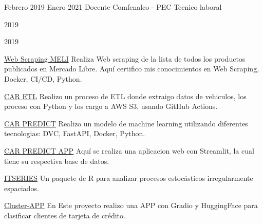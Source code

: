 {Febrero 2019}
{Enero 2021}
{Docente}
{Comfenalco - PEC}
{Tecnico laboral}
{
\jbegin
\jend
}



{2019}
{\lrand[1]}
{\lrand[3]}
{\jbegin
    \jitem{\lrand[27]}
    \jitem{ \lrand[28]}
\jend}


{2019}
{\lrand[1]}
{\lrand[3]}
{\jbegin
    \jitem{\lrand[27]}
    \jitem{ \lrand[28]}
    \jitem{ \lrand[30]}
\jend}

{}
{\lrand[1]}
{\lrand[2]}
{\jbegin
    \item{\lrand[20]{}}
    \item {\lrand[30]}
    \item {\lrand[2]}
\jend}

{}
{\href{https://github.com/Wilmar3752/meli_scrapper}{Web Scraping MELI}}
{Realiza Web scraping de la lista de todos los productos publicados en Mercado Libre. Aquí certifico mis conocimientos en Web Scraping, Docker, CI/CD, Python.}
{}

{}
{\href{https://github.com/Wilmar3752/ETL_scraper}{CAR ETL}}
{Realizo un proceso de ETL donde extraigo datos de vehiculos, los proceso con Python y los cargo a AWS S3, usando GitHub Actions.}
{}

{}
{\href{https://github.com/Wilmar3752/car_predict}{CAR PREDICT}}
{Realizo un modelo de machine learning utilizando diferentes tecnologias: DVC, FastAPI, Docker, Python.}
{}

{}
{\href{https://github.com/Wilmar3752/car_predict}{CAR PREDICT APP}}
{Aquí se realiza una aplicacion web con Streamlit, la cual tiene su respectiva base de datos.}
{}

{}
{\href{https://github.com/Wilmar3752/itseries}{ITSERIES}}
{Un paquete de R para analizar procesos estocásticos irregularmente espaciados.}
{}

{}
{\href{https://github.com/Wilmar3752/cluster-app}{Cluster-APP}}
{En Este proyecto realizo una APP con Gradio y HuggingFace para clasificar clientes de tarjeta de crédito.}
{}








